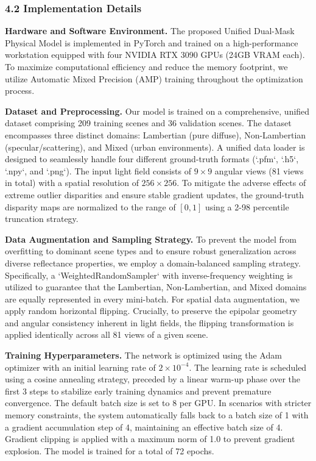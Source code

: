 \documentclass[journal]{IEEEtran}
\begin{document}
\subsubsection{4.2 Implementation Details}

\textbf{Hardware and Software Environment.} 
The proposed Unified Dual-Mask Physical Model is implemented in PyTorch and trained on a high-performance workstation equipped with four NVIDIA RTX 3090 GPUs (24GB VRAM each). To maximize computational efficiency and reduce the memory footprint, we utilize Automatic Mixed Precision (AMP) training throughout the optimization process. 

\textbf{Dataset and Preprocessing.} 
Our model is trained on a comprehensive, unified dataset comprising 209 training scenes and 36 validation scenes. The dataset encompasses three distinct domains: Lambertian (pure diffuse), Non-Lambertian (specular/scattering), and Mixed (urban environments). A unified data loader is designed to seamlessly handle four different ground-truth formats (`.pfm`, `.h5`, `.npy`, and `.png`). The input light field consists of $9 \times 9$ angular views (81 views in total) with a spatial resolution of $256 \times 256$. To mitigate the adverse effects of extreme outlier disparities and ensure stable gradient updates, the ground-truth disparity maps are normalized to the range of $[0, 1]$ using a 2-98 percentile truncation strategy.

\textbf{Data Augmentation and Sampling Strategy.} 
To prevent the model from overfitting to dominant scene types and to ensure robust generalization across diverse reflectance properties, we employ a domain-balanced sampling strategy. Specifically, a `WeightedRandomSampler` with inverse-frequency weighting is utilized to guarantee that the Lambertian, Non-Lambertian, and Mixed domains are equally represented in every mini-batch. For spatial data augmentation, we apply random horizontal flipping. Crucially, to preserve the epipolar geometry and angular consistency inherent in light fields, the flipping transformation is applied identically across all 81 views of a given scene.

\textbf{Training Hyperparameters.} 
The network is optimized using the Adam optimizer with an initial learning rate of $2 \times 10^{-4}$. The learning rate is scheduled using a cosine annealing strategy, preceded by a linear warm-up phase over the first 3 steps to stabilize early training dynamics and prevent premature convergence. The default batch size is set to 8 per GPU. In scenarios with stricter memory constraints, the system automatically falls back to a batch size of 1 with a gradient accumulation step of 4, maintaining an effective batch size of 4. Gradient clipping is applied with a maximum norm of 1.0 to prevent gradient explosion. The model is trained for a total of 72 epochs. 
\end{document}
